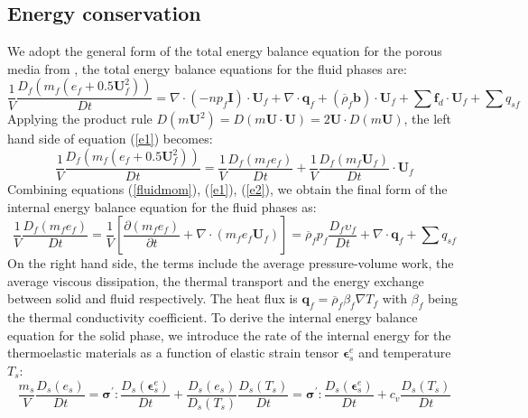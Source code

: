 \documentclass[preprint,12pt]{elsarticle}
\begin{document}
\subsection{\textsf{Energy conservation}}
We adopt the general form of the total energy balance equation for the porous media from \cite{Hassanizadeh}, the total energy balance equations for the fluid phases are:
%
%
\begin{equation}
\label{e1}
     \frac{1}{V}\frac{D_f(m_f (e_f+0.5\pmb{U}_f^2))}{Dt} = \nabla \cdot (-np_f\pmb{I}) \cdot \pmb{U}_f + \nabla \cdot \pmb{q}_f + (\overline{\rho}_f \pmb{b}) \cdot \pmb{U}_f +  \sum \pmb{f}_{d} \cdot \pmb{U}_f +  \sum q_{sf}
\end {equation}
%
%
Applying the product rule $D(m\pmb{U}^2)=D(m \pmb{U} \cdot \pmb{U}) = 2 \pmb{U} \cdot D(m \pmb{U})$, the left hand side of equation (\ref{e1}) becomes:\\
%
%
\begin{equation}
\label{e2}
     \frac{1}{V}\frac{D_f(m_f (e_f+0.5\pmb{U}_f^2))}{Dt}  = \frac{1}{V}\frac{D_f(m_f e_f)}{Dt} + \frac{1}{V}\frac{D_f(m_f \pmb{U}_f)}{Dt} \cdot \pmb{U}_f 
\end {equation}
%
%
Combining equations (\ref{fluidmom}), (\ref{e1}), (\ref{e2}), we obtain the final form of the internal energy balance equation for the fluid phases as:
%
%
\begin{equation}
     \frac{1}{V}\frac{D_f(m_f e_f)}{Dt} = \frac{1}{V} \left[ \frac{\partial (m_f e_f)}{\partial t} + \nabla \cdot  (m_f e_f \pmb{U}_f) \right] 
   = \overline{\rho}_f p_f  \frac{D_f\upsilon_f}{Dt} + \nabla \cdot \pmb{q}_f +  \sum q_{sf}
\end {equation}
%
%
On the right hand side, the terms include the average pressure-volume work, the average viscous dissipation, the thermal transport and the energy exchange between solid and fluid respectively. The heat flux is $\pmb{q}_f = \overline{\rho}_f \beta_f \nabla T_f$ with $\beta_f$ being the thermal conductivity coefficient. To derive the internal energy balance equation for the solid phase, we introduce the rate of the internal energy  for the thermoelastic materials as a function of elastic strain tensor $\pmb{\epsilon}_s^e$ and temperature $T_s$:
%
%
\begin{equation}
   \frac{m_s}{V} \frac{D_s( e_s)}{Dt} = \pmb{\sigma}^\prime :\frac{D_s( \pmb{\epsilon}_s^e)}{Dt} + \frac{D_s( e_s)}{D_s (T_s)} \frac{D_s( T_s)}{Dt} = \pmb{\sigma}^\prime :\frac{D_s( \pmb{\epsilon}_s^e)}{Dt} + c_v \frac{D_s( T_s)}{Dt}
\label{internalEnergy}
\end {equation}
\end{document}
